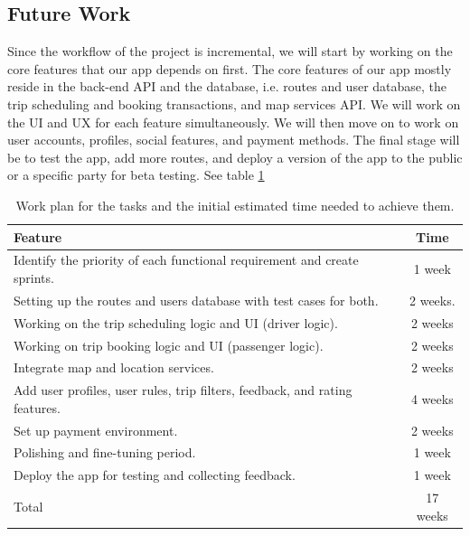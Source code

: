\documentclass[a4paper, 12pt]{article} %
\begin{document}
        \subsection{Future Work}
            Since the workflow of the project is incremental, we will start by working on the core features that our app depends on first. The core features of our app mostly reside in the back-end API and the database, i.e. routes and user database, the trip scheduling and booking transactions, and map services API. We will work on the UI and UX for each feature simultaneously. We will then move on to work on user accounts, profiles, social features, and payment methods. The final stage will be to test the app, add more routes, and deploy a version of the app to the public or a specific party for beta testing. See table \ref{2ndSemWorkPlanTable}
            \begin{table}[h]
               \caption{Work plan for the tasks and the initial estimated time needed to achieve them.}
               \label{2ndSemWorkPlanTable}
                \begin{center}
                    \begin{tabular}{m{10cm}|c}
                        \centering Feature & Time \\ %
                        \hline
                         Identify the priority of each functional requirement and create sprints.  & 1 week \\
                         Setting up the routes and users database with test cases for both. & 2 weeks. \\
                         Working on the trip scheduling logic and UI (driver logic). & 2 weeks \\
                         Working on trip booking logic and UI (passenger logic). & 2 weeks \\
                         Integrate map and location services. & 2 weeks \\
                         Add user profiles, user rules, trip filters, feedback, and rating features. & 4 weeks \\
                         Set up payment environment. & 2 weeks \\
                         Polishing and fine-tuning period. & 1 week \\
                         Deploy the app for testing and collecting feedback. & 1 week \\
                        \hline
                        \centering Total & 17 weeks \\
                    \end{tabular}
                \end{center}
            \end{table}

    \clearpage 
    \printbibliography
\end{document}
